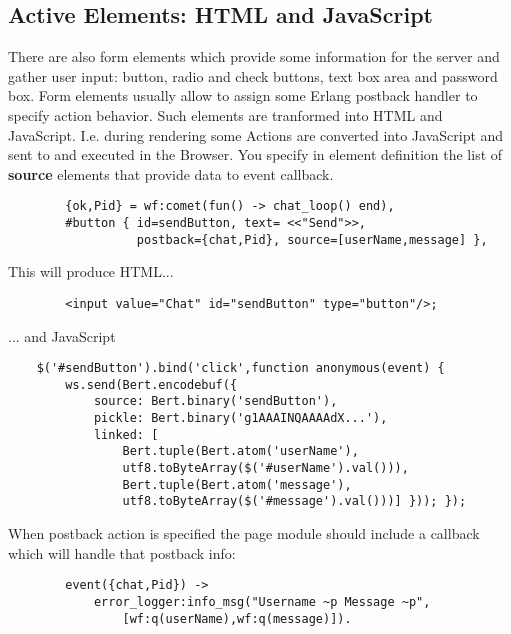 \subsection{Active Elements: HTML and JavaScript}
There are also form elements which provide some information for the server
and gather user input:  button, radio and check buttons, text box area and password box.
Form elements usually allow to assign some Erlang postback handler to specify action behavior.
Such elements are tranformed into HTML and JavaScript. I.e. during rendering some
Actions are converted into JavaScript and sent to and executed in the Browser.
You specify in element definition the list of {\bf source} elements that provide data to event callback.

\vspace{1\baselineskip}
\begin{lstlisting}
        {ok,Pid} = wf:comet(fun() -> chat_loop() end),
        #button { id=sendButton, text= <<"Send">>, 
                  postback={chat,Pid}, source=[userName,message] },
\end{lstlisting}
\vspace{1\baselineskip}

This will produce HTML...

\vspace{1\baselineskip}
\begin{lstlisting}
        <input value="Chat" id="sendButton" type="button"/>;
\end{lstlisting}
\vspace{1\baselineskip}

... and JavaScript

\vspace{1\baselineskip}
\begin{lstlisting}
    $('#sendButton').bind('click',function anonymous(event) { 
        ws.send(Bert.encodebuf({
            source: Bert.binary('sendButton'), 
            pickle: Bert.binary('g1AAAINQAAAAdX...'),
            linked: [
                Bert.tuple(Bert.atom('userName'),
                utf8.toByteArray($('#userName').val())),
                Bert.tuple(Bert.atom('message'),
                utf8.toByteArray($('#message').val()))] })); });
\end{lstlisting}
\vspace{1\baselineskip}

When postback action is specified the page module should include a callback which will handle that postback info:

\vspace{1\baselineskip}
\begin{lstlisting}
        event({chat,Pid}) ->
            error_logger:info_msg("Username ~p Message ~p",
                [wf:q(userName),wf:q(message)]).
\end{lstlisting}
\vspace{1\baselineskip}

